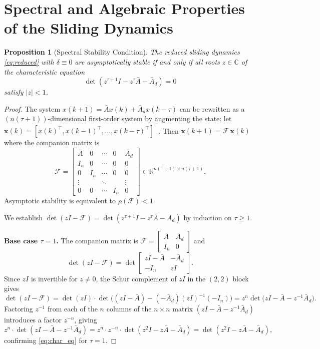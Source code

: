\documentclass[10pt]{amsart}
\numberwithin{equation}{section}
\newtheorem{proposition}[theorem]{Proposition}
\begin{document}
\section{Spectral and Algebraic Properties of the Sliding Dynamics}\label{sec:spectral}

\begin{proposition}[Spectral Stability Condition]\label{prop:spectral}
The reduced sliding dynamics \eqref{eq:reduced} with $\delta \equiv 0$ are
asymptotically stable if and only if all roots $z\in\mathbb{C}$ of the characteristic
equation
\begin{equation}\label{eq:char_eq}
\det\!\left(z^{\tau+1} I - z^\tau \bar{A} - \bar{A}_d\right) = 0
\end{equation}
satisfy $|z| < 1$.
\end{proposition}
\begin{proof}
The system $x(k+1) = \bar{A} x(k) + \bar{A}_d x(k-\tau)$ can be rewritten as a
$(n(\tau+1))$-dimensional first-order system by augmenting the state: let
$\mathbf{x}(k) = [x(k)^\top, x(k-1)^\top, \ldots, x(k-\tau)^\top]^\top$. Then
$\mathbf{x}(k+1) = \mathcal{F}\,\mathbf{x}(k)$ where the companion matrix is
\[
\mathcal{F} = \begin{bmatrix}
\bar{A} & 0 & \cdots & 0 & \bar{A}_d \\
I_n     & 0 & \cdots & 0 & 0 \\
0       & I_n & \cdots & 0 & 0 \\
\vdots  &   & \ddots &   & \vdots \\
0       & 0 & \cdots & I_n & 0
\end{bmatrix} \in \mathbb{R}^{n(\tau+1)\times n(\tau+1)}.
\]
Asymptotic stability is equivalent to $\rho(\mathcal{F}) < 1$.

We establish $\det(zI - \mathcal{F}) = \det(z^{\tau+1}I - z^\tau\bar{A} - \bar{A}_d)$
by induction on $\tau \geq 1$.

\textbf{Base case $\tau=1$.} The companion matrix is
$\mathcal{F} = \begin{bmatrix}\bar{A} & \bar{A}_d \\ I_n & 0\end{bmatrix}$ and
\[
\det(zI - \mathcal{F})
= \det\!\begin{bmatrix}zI-\bar{A} & -\bar{A}_d \\ -I_n & zI\end{bmatrix}.
\]
Since $zI$ is invertible for $z\neq 0$, the Schur complement of $zI$ in the
$(2,2)$ block gives
\[
\det(zI-\mathcal{F})
= \det(zI)\cdot\det\!\bigl((zI-\bar{A}) - (-\bar{A}_d)(zI)^{-1}(-I_n)\bigr)
= z^n\det\!\bigl(zI - \bar{A} - z^{-1}\bar{A}_d\bigr).
\]
Factoring $z^{-1}$ from each of the $n$ columns of the $n\times n$ matrix
$(zI - \bar{A} - z^{-1}\bar{A}_d)$ introduces a factor $z^{-n}$, giving
\[
z^n \cdot \det(zI - \bar{A} - z^{-1}\bar{A}_d)
= z^n \cdot z^{-n} \cdot \det(z^2 I - z\bar{A} - \bar{A}_d)
= \det(z^2 I - z\bar{A} - \bar{A}_d),
\]
confirming \eqref{eq:char_eq} for $\tau=1$.


\end{proof}
\end{document}
